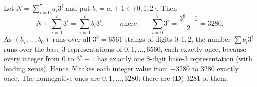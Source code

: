 Let $N=\sum_{i=0}^{7}a_i3^i$ and put $b_i=a_i+1\in\{0,1,2\}$. Then
\[N+\sum_{i=0}^{7}3^i=\sum_{i=0}^{7}b_i3^i,\qquad\text{where}\qquad\sum_{i=0}^{7}3^i=\dfrac{3^8-1}{2}=3280.\]
As $(b_7,\dots,b_0)$ runs over all $3^8=6561$ strings of digits $0,1,2$, the number $\sum b_i3^i$ runs over the base-$3$ representations of $0,1,\dots,6560$, each exactly once, because every integer from $0$ to $3^8-1$ has exactly one $8$-digit base-$3$ representation (with leading zeros). Hence $N$ takes each integer value from $-3280$ to $3280$ exactly once. The nonnegative ones are $0,1,\dots,3280$: there are $\boxed{\textbf{(D) } 3281}$ of them.
